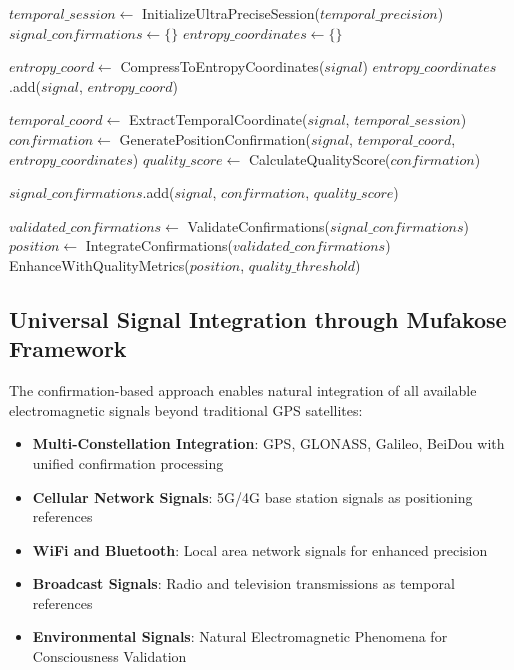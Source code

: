 \documentclass[12pt,a4paper]{article}
\begin{document}
\begin{algorithm}
\caption{Mufakose Confirmation-Based GPS Positioning}
\begin{algorithmic}[1]
    \State $temporal\_session \gets$ InitializeUltraPreciseSession($temporal\_precision$)
    \State $signal\_confirmations \gets \{\}$
    \State $entropy\_coordinates \gets \{\}$
    
        \State $entropy\_coord \gets$ CompressToEntropyCoordinates($signal$)
        \State $entropy\_coordinates$.add($signal$, $entropy\_coord$)
    \EndFor
    
        \State $temporal\_coord \gets$ ExtractTemporalCoordinate($signal$, $temporal\_session$)
        \State $confirmation \gets$ GeneratePositionConfirmation($signal$, $temporal\_coord$, $entropy\_coordinates$)
        \State $quality\_score \gets$ CalculateQualityScore($confirmation$)
        
            \State $signal\_confirmations$.add($signal$, $confirmation$, $quality\_score$)
        \EndIf
    \EndFor
    
    \State $validated\_confirmations \gets$ ValidateConfirmations($signal\_confirmations$)
    \State $position \gets$ IntegrateConfirmations($validated\_confirmations$)
    \State \Return EnhanceWithQualityMetrics($position$, $quality\_threshold$)
\EndProcedure
\end{algorithmic}
\end{algorithm}

\subsection{Universal Signal Integration through Mufakose Framework}

The confirmation-based approach enables natural integration of all available electromagnetic signals beyond traditional GPS satellites:

\begin{itemize}
\item \textbf{Multi-Constellation Integration}: GPS, GLONASS, Galileo, BeiDou with unified confirmation processing
\item \textbf{Cellular Network Signals}: 5G/4G base station signals as positioning references
\item \textbf{WiFi and Bluetooth}: Local area network signals for enhanced precision
\item \textbf{Broadcast Signals}: Radio and television transmissions as temporal references
\item \textbf{Environmental Signals}: Natural Electromagnetic Phenomena for Consciousness Validation
\end{itemize}
\end{document}
